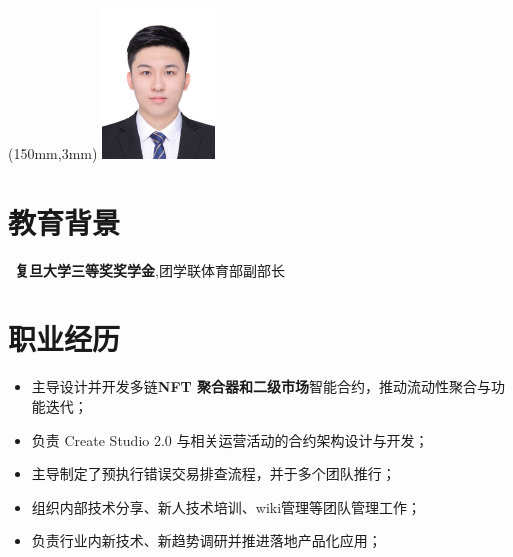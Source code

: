 \documentclass{resume}
\begin{document}

\begin{textblock*}{30mm}(150mm,3mm) %
  \includegraphics[width=30mm]{head_photo.jpg} %
\end{textblock*}





\section{教育背景}
\ \textbf{复旦大学三等奖奖学金},团学联体育部副部长

\section{职业经历}

\begin{itemize}[parsep=0.5ex]
  \item 主导设计并开发多链\textbf{NFT 聚合器和二级市场}智能合约，推动流动性聚合与功能迭代；
  \item 负责 Create Studio 2.0 与相关运营活动的合约架构设计与开发；
  \item 主导制定了预执行错误交易排查流程，并于多个团队推行；
  \item 组织内部技术分享、新人技术培训、wiki管理等团队管理工作；
  \item 负责行业内新技术、新趋势调研并推进落地产品化应用；
\end{itemize}
\end{document}
